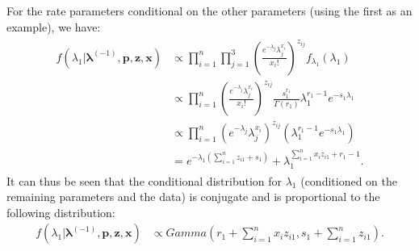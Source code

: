 \begin{DoubleSpace*}
For the rate parameters conditional on the other parameters (using the first as an example), we have:
\begin{align}
\begin{split}
	f(\lambda_1|\boldsymbol{\lambda}^{(-1)},\textbf{p},\textbf{z},\textbf{x})&\propto \prod_{i=1}^{n} \prod_{j=1}^3 \left(\frac{e^{-\lambda_j}\lambda_j^{x_i}}{x_i!}\right)^{z_{ij}} f_{\lambda_1}(\lambda_1) \\
	&\propto \prod_{i=1}^{n} \left(\frac{e^{-\lambda_j}\lambda_j^{x_i}}{x_i!}\right)^{z_{ij}} \frac{s_1^{r_1}}{\Gamma(r_1)} \lambda_1^{r_1-1} e^{-s_1 \lambda_1}\\
	&\propto \prod_{i=1}^{n} \left( e^{-\lambda_j}\lambda_j^{x_i} \right)^{z_{ij}} \left( \lambda_1^{r_1-1} e^{-s_1 \lambda_1} \right) \\
	&= e^{-\lambda_1 (\sum_{i=1}^n z_{i1}+s_1)}+\lambda_1^{\sum_{i=1}^n x_i z_{i1}+r_1-1}.
\end{split}
\end{align}
It can thus be seen that the conditional distribution for $\lambda_1$ (conditioned on the remaining parameters and the data) is conjugate and is proportional to the following distribution:
\begin{align}
		f(\lambda_1|\boldsymbol{\lambda}^{(-1)},\textbf{p},\textbf{z},\textbf{x})&\propto Gamma \left( r_1+\sum_{i=1}^n x_i z_{i1}, s_1+\sum_{i=1}^n z_{i1} \right). 
\end{align}

\end{DoubleSpace*}
